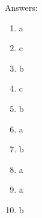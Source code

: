 \documentclass[paper=8.2in:11.6in]{scrartcl}
\begin{document}
\begin{enumerate}
\begin{enumerate}[label=\alph*)]
\end{enumerate}

\newpage


Answers:

\begin{enumerate}[label=\arabic*)]

\item a
\item c
\item b
\item c
\item b
\item a
\item b
\item a
\item a
\item b


\end{enumerate}

\end{enumerate}
\end{document}
